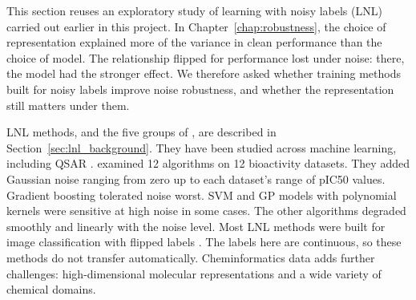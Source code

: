 %
%
This section reuses an exploratory study of learning with noisy labels (LNL) carried out earlier in this project. In Chapter~\ref{chap:robustness}, the choice of representation explained more of the variance in clean performance than the choice of model. The relationship flipped for performance lost under noise: there, the model had the stronger effect. We therefore asked whether training methods built for noisy labels improve noise robustness, and whether the representation still matters under them.

LNL methods, and the five groups of \citet{Song2022}, are described in Section~\ref{sec:lnl_background}. They have been studied across machine learning, including QSAR \citep{Cortes2015}. \citet{Cortes2015} examined 12 algorithms on 12 bioactivity datasets. They added Gaussian noise ranging from zero up to each dataset's range of pIC50 values. Gradient boosting tolerated noise worst. SVM and GP models with polynomial kernels were sensitive at high noise in some cases. The other algorithms degraded smoothly and linearly with the noise level. Most LNL methods were built for image classification with flipped labels \citep{Song2022}. The labels here are continuous, so these methods do not transfer automatically. Cheminformatics data adds further challenges: high-dimensional molecular representations and a wide variety of chemical domains.

